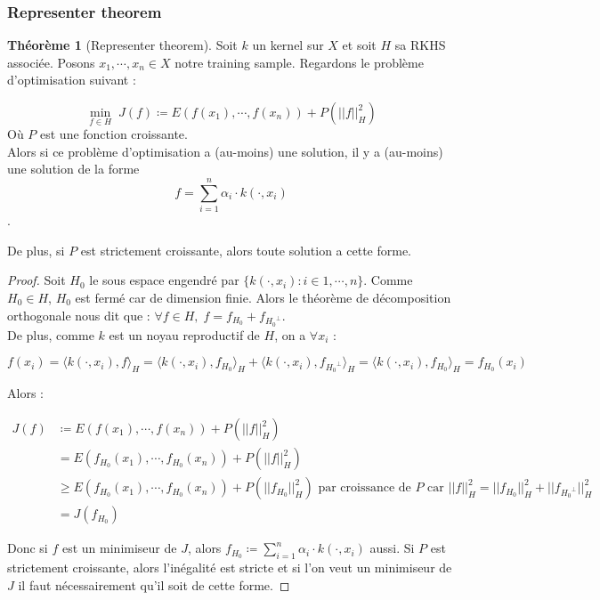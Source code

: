 \documentclass[a4paper, 11pt, french]{article}
\theoremstyle{definition}
\newtheorem{theorem}{Théorème}
\begin{document}
	\subsubsection{Representer theorem}
	
	\begin{theorem}[Representer theorem]
		Soit $k$ un kernel sur $X$ et soit $H$ sa RKHS associée. Posons $x_1, \cdots, x_n \in X$ notre training sample. Regardons le problème d'optimisation suivant :
		
		\[\min_{f \in H} \; J(f) \coloneqq E(f(x_1), \cdots, f(x_n)) + P(||f||_H^2)\]
		Où $P$ est une fonction croissante. \\
		
		Alors si ce problème d'optimisation a (au-moins) une solution, il y a (au-moins) une solution de la forme \[f = \sum_{i=1}^{n} \alpha_i \cdot k(\cdot, x_i)\].
		
		De plus, si $P$ est strictement croissante, alors toute solution a cette forme.
	\end{theorem}
	\begin{proof}
		Soit $H_0$ le sous espace engendré par $\{k(\cdot, x_i ) : i \in 1, \cdots, n\}$. Comme $H_0 \in H$, $H_0$ est fermé car de dimension finie. Alors le théorème de décomposition orthogonale nous dit que : $\forall f \in H, \; f = f_{H_0} + f_{{H_0}^\perp}$. \\
		
		De plus, comme $k$ est un noyau reproductif de $H$, on a $\forall x_i$ :
		
		\[f(x_i) = \langle k(\cdot, x_i), f \rangle_H = \langle k(\cdot, x_i), f_{H_0} \rangle_H + \langle k(\cdot, x_i), f_{{H_0}^\perp} \rangle_H = \langle k(\cdot, x_i), f_{H_0} \rangle_H = f_{H_0} (x_i) \]
		
		Alors :
		
		\begin{align*}
			J(f) &\coloneqq E(f(x_1), \cdots, f(x_n)) + P(||f||_H^2) \\
			&= E(f_{H_0}(x_1), \cdots, f_{H_0}(x_n)) + P(||f||_H^2) \\
			&\geq E(f_{H_0}(x_1), \cdots, f_{H_0}(x_n)) + P(||f_{H_0}||_H^2) \text{ par croissance de $P$ car $||f||_H^2 = ||f_{H_0}||_H^2 + ||f_{{H_0}^\perp}||_H^2$}\\
			&= J(f_{H_0})
		\end{align*}
	
		Donc si $f$ est un minimiseur de $J$, alors $f_{H_0} \coloneqq \sum_{i=1}^{n} \alpha_i \cdot k(\cdot, x_i)$ aussi. Si $P$ est strictement croissante, alors l'inégalité est stricte et si l'on veut un minimiseur de $J$ il faut nécessairement qu'il soit de cette forme.
	\end{proof}
\end{document}
